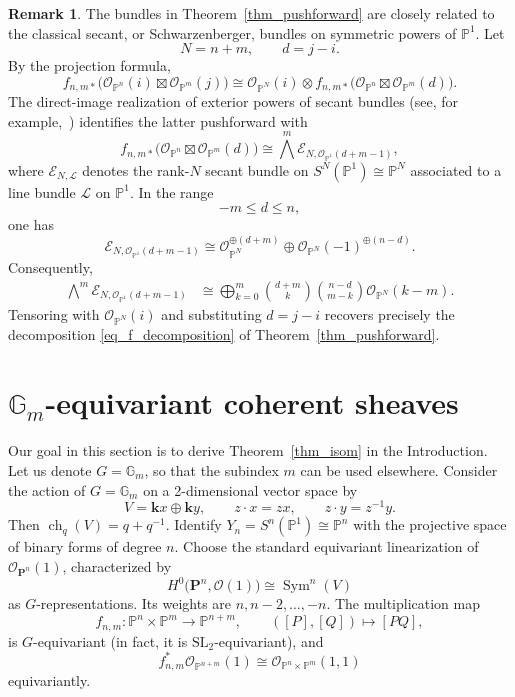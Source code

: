 \documentclass{article}
\newcommand{\kk}{\mathbf{k}}
\newcommand{\mcO}{\mathcal{O}}
\newcommand{\mcL}{\mathcal{L}}
\newcommand{\PP}{\mathbb{P}}
\DeclareMathOperator{\ch}{ch}
\theoremstyle{definition}
\newtheorem{remark}[thm]{Remark}
\theoremstyle{definition}
\begin{document}
\begin{remark} The bundles in Theorem~\ref{thm_pushforward} are closely related to the classical secant, or Schwarzenberger, bundles on symmetric powers of $\PP^1$.
Let \[ N=n+m,\qquad d=j-i. \] By the projection formula,
\[ f_{n,m*}\bigl(\mcO_{\PP^n}(i)\boxtimes \mcO_{\PP^m}(j)\bigr) \cong \mcO_{\PP^N}(i)\otimes f_{n,m*}\bigl(\mcO_{\PP^n}\boxtimes \mcO_{\PP^m}(d)\bigr).
\]
The direct-image realization of exterior powers of secant bundles (see, for example,~\cite[Theorem~3.1]{RaicuSam}) identifies the latter pushforward with
\[ f_{n,m*}\bigl(\mcO_{\PP^n}\boxtimes \mcO_{\PP^m}(d)\bigr) \cong \bigwedge^m \mathcal{E}_{N,\mcO_{\PP^1}(d+m-1)}, \]
where $\mathcal{E}_{N,\mcL}$ denotes the rank-$N$ secant bundle on $S^N(\PP^1)\cong\PP^N$ associated to a line bundle $\mcL$ on $\PP^1$. In the range \[ -m\le d\le n, \] one has
\[
\mathcal{E}_{N,\mcO_{\PP^1}(d+m-1)} \cong \mcO_{\PP^N}^{\oplus(d+m)} \oplus \mcO_{\PP^N}(-1)^{\oplus(n-d)}.
\]
Consequently,
\[
\begin{aligned} \bigwedge^m \mathcal{E}_{N,\mcO_{\PP^1}(d+m-1)} &\cong \bigoplus_{k=0}^m \binom{d+m}{k} \binom{n-d}{m-k} \mcO_{\PP^N}(k-m). \end{aligned}
\]
Tensoring with $\mcO_{\PP^N}(i)$ and substituting $d=j-i$ recovers precisely the decomposition \eqref{eq_f_decomposition} of Theorem~\ref{thm_pushforward}. \end{remark}


%
%


\section{\texorpdfstring{$\mathbb{G}_m$}{Gm}-equivariant coherent sheaves}
\label{sec_equiv_coherent}

Our goal in this section is to derive Theorem~\ref{thm_isom} in the Introduction. Let us denote $G=\mathbb{G}_m$, so that the subindex $m$ can be used elsewhere.
Consider the action of $G=\mathbb{G}_m$ on a 2-dimensional vector space by
\begin{equation}\label{eq_V_action}
V = \kk x \oplus \kk y, \qquad z \cdot x = zx, \qquad z \cdot y = z^{-1}y.
\end{equation}
Then $\ch_q(V) = q + q^{-1}.$
Identify
$Y_n = S^n(\PP^1) \cong \PP^n$
with the projective space of binary forms of degree $n$. Choose the standard equivariant linearization of $\mathcal{O}_{\mathbf{P}^n}(1)$, characterized by
\begin{equation}\label{eq_linearize}
H^0\bigl(\mathbf{P}^n, \mathcal{O}(1)\bigr) \cong \operatorname{Sym}^n(V)
\end{equation}
as $G$-representations. Its weights are $n, n-2, \ldots, -n$.
The multiplication map
\[
f_{n,m} \colon \PP^n \times \PP^m \longrightarrow \PP^{n+m}, \qquad ([P],[Q]) \longmapsto [PQ],
\]
is $G$-equivariant (in fact, it is $\mathrm{SL}_2$-equivariant), and
\begin{equation}\label{eq_eq_fnm}
f_{n,m}^* \mathcal{O}_{\PP^{n+m}}(1) \cong \mathcal{O}_{\PP^n \times \PP^m}(1,1)
\end{equation}
equivariantly.
\end{document}
